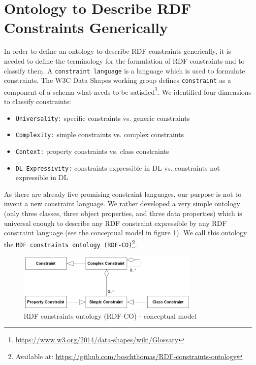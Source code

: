 \documentclass{llncs}
\newcommand{\ms}[1]{\texttt{#1}}
\begin{document}
\section{Ontology to Describe RDF Constraints Generically} 
\label{sec:ontology}

In order to define an ontology to describe RDF constraints generically, it is needed to define the terminology for the formulation of RDF constraints and to classify them. 
A \ms{constraint language} is a language which is used to formulate constraints.
The W3C Data Shapes working group defines \ms{constraint} as a component of a schema what needs to be satisfied\footnote{\url{https://www.w3.org/2014/data-shapes/wiki/Glossary}}.
We identified four dimensions to classify constraints:
\begin{itemize}
  \item \ms{Universality:} specific constraints vs. generic constraints
	\item \ms{Complexity:} simple constraints vs. complex constraints
	\item \ms{Context:} property constraints vs. class constraints
	\item \ms{DL Expressivity:} constraints expressible in DL vs. constraints not expressible in DL
\end{itemize}

As there are already five promising constraint languages, our purpose is not to invent a new constraint language.
We rather developed a very simple ontology (only three classes, three object properties, and three data properties) which is universal enough to describe any RDF constraint expressible by any RDF constraint language (see the conceptual model in figure \ref{fig:RDF-CO-conceptual-model}).
We call this ontology the \ms{RDF constraints ontology (RDF-CO)}\footnote{Available at: \url{https://github.com/boschthomas/RDF-constraints-ontology}}.

\begin{figure}
	\centering
		\includegraphics[width=0.80\textwidth]{images/RDF-CO-conceptual-model.png}
	\caption{RDF constraints ontology (RDF-CO) - conceptual model}
	\label{fig:RDF-CO-conceptual-model}
\end{figure}
\end{document}
